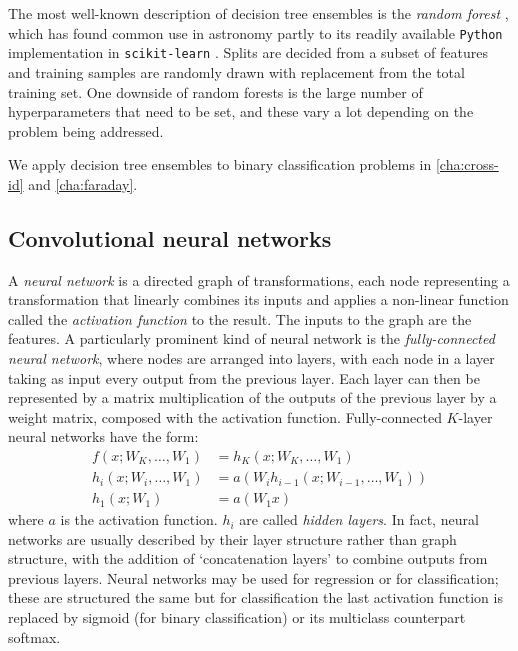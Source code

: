 \documentclass[11pt, a4paper]{book}
\newcommand{\defn}[1]{\emph{#1}}
\begin{document}
        The most well-known description of decision tree ensembles is the \defn{random forest} \citep{breiman01random-forest}, which has found common use in astronomy partly to its readily available \texttt{Python} implementation in \texttt{scikit-learn} \citep{pedregosa11sklearn}. Splits are decided from a subset of features and training samples are randomly drawn with replacement from the total training set. One downside of random forests is the large number of hyperparameters that need to be set, and these vary a lot depending on the problem being addressed.

        We apply decision tree ensembles to binary classification problems in \autoref{cha:cross-id} and \autoref{cha:faraday}.

    \subsection{Convolutional neural networks}
    \label{sec:cnns}

        A \defn{neural network} is a directed graph of transformations, each node representing a transformation that linearly combines its inputs and applies a non-linear function called the \defn{activation function} to the result. The inputs to the graph are the features. A particularly prominent kind of neural network is the \defn{fully-connected neural network}, where nodes are arranged into layers, with each node in a layer taking as input every output from the previous layer. Each layer can then be represented by a matrix multiplication of the outputs of the previous layer by a weight matrix, composed with the activation function. Fully-connected $K$-layer neural networks have the form:
        \begin{align}
            f(x; W_K, \dots, W_1) &= h_K(x; W_K, \dots, W_1)\\
            h_i(x; W_i, \dots, W_1) &= a(W_i h_{i - 1}(x; W_{i - 1}, \dots, W_1))\label{eq:hidden-layer}\\
            h_1(x; W_1) &= a(W_1 x)
        \end{align}
        where $a$ is the activation function. $h_i$ are called \defn{hidden layers}. In fact, neural networks are usually described by their layer structure rather than graph structure, with the addition of `concatenation layers' to combine outputs from previous layers. Neural networks may be used for regression or for classification; these are structured the same but for classification the last activation function is replaced by sigmoid (for binary classification) or its multiclass counterpart softmax.
\end{document}
